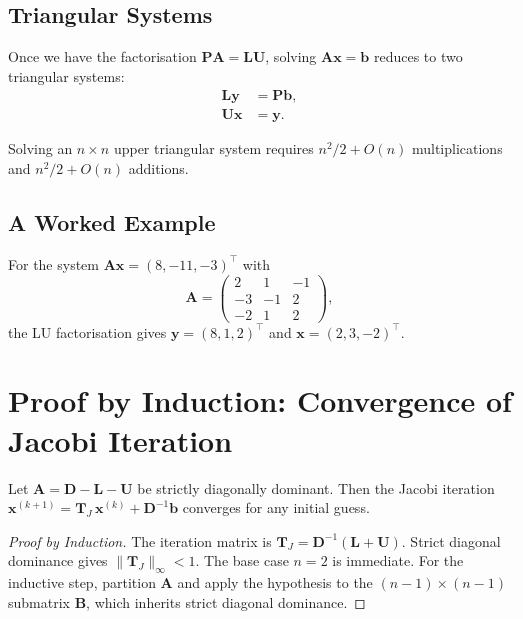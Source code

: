 \documentclass[
    language=english,
    doctype=lecture-notes,
    institution=none,
]{../../omnilatex}
\begin{document}
\subsection{Triangular Systems}

Once we have the factorisation $\mathbf{PA} = \mathbf{LU}$, solving
$\mathbf{Ax} = \mathbf{b}$ reduces to two triangular systems:
\begin{align}
    \mathbf{Ly} &= \mathbf{Pb}, \label{eq:forward} \\
    \mathbf{Ux} &= \mathbf{y}. \label{eq:backward}
\end{align}

\begin{lemma}\label{lem:backsub}
Solving an $n \times n$ upper triangular system requires
$n^2/2 + O(n)$ multiplications and $n^2/2 + O(n)$ additions.
\end{lemma}

\subsection{A Worked Example}

\begin{example}\label{ex:3x3}
For the system
$\mathbf{A}\mathbf{x} = (8, -11, -3)^{\top}$ with
\[
    \mathbf{A} = \begin{pmatrix}
        2 & 1 & -1 \\ -3 & -1 & 2 \\ -2 & 1 & 2
    \end{pmatrix},
\]
the LU factorisation gives $\mathbf{y} = (8, 1, 2)^{\top}$ and
$\mathbf{x} = (2, 3, -2)^{\top}$.
\end{example}

\section{Proof by Induction: Convergence of Jacobi Iteration}

\begin{theorem}\label{thm:jacobi}
Let $\mathbf{A} = \mathbf{D} - \mathbf{L} - \mathbf{U}$ be strictly
diagonally dominant. Then the Jacobi iteration
$\mathbf{x}^{(k+1)} = \mathbf{T}_J\,\mathbf{x}^{(k)} +
\mathbf{D}^{-1}\mathbf{b}$ converges for any initial guess.
\end{theorem}

\begin{proof}[Proof by Induction]
The iteration matrix is $\mathbf{T}_J = \mathbf{D}^{-1}(\mathbf{L}+\mathbf{U})$.
Strict diagonal dominance gives $\|\mathbf{T}_J\|_\infty < 1$. The base case
$n=2$ is immediate. For the inductive step, partition $\mathbf{A}$ and apply
the hypothesis to the $(n{-}1) \times (n{-}1)$ submatrix $\mathbf{B}$, which
inherits strict diagonal dominance.
\end{proof}
\end{document}
